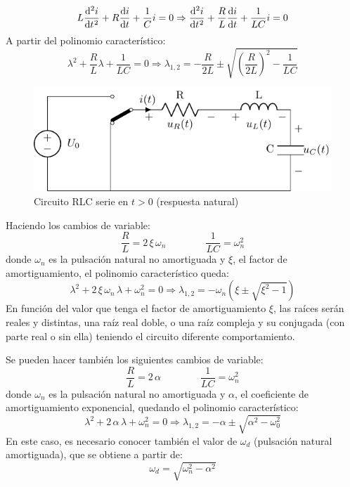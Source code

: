 \[
  L\diff[2]{i}{t} + R\diff{i}{t} + \frac{1}{C} i = 0 \Rightarrow
  {\diff[2]{i}{t} + \frac{R}{L} \diff{i}{t} + \frac{1}{LC} i = 0}
\]
A partir del polinomio característico:
\[
  \lambda^2 + \frac{R}{L} \lambda + \frac{1}{LC} = 0 \Rightarrow
  \lambda_{1,2} = -\frac{R}{2L} \pm \sqrt{\left(\frac{R}{2L}\right)^2
    - \frac{1}{LC}}
\]
\begin{figure}[H]
  \centering
  \includegraphics{../figs/transitorio_circuitoRLC_serie_t0+.pdf}
  \caption{Circuito RLC serie en $t>0$ (respuesta natural)}
  \label{fig.transitorio_serie_t0+}
\end{figure}

Haciendo los cambios de variable:
\begin{equation*} {\dfrac{R}{L}=2\,\xi\,\omega_n}\qquad \qquad
  {\dfrac{1}{LC}=\omega_n^2}
\end{equation*}
donde $\omega_n$ es la pulsación natural no amortiguada y $\xi$, el
factor de amortiguamiento, el polinomio característico queda:
\begin{equation*}
  \lambda^2+2\,\xi\,\omega_n\,\lambda + \omega_n^2=0 \Rightarrow \lambda_{1,2}=-\omega_n\left(\xi\pm\sqrt{\xi^2-1}\right)
\end{equation*}
En función del valor que tenga el factor de amortiguamiento $\xi$, las
raíces serán reales y distintas, una raíz real doble, o una raíz
compleja y su conjugada (con parte real o sin ella) teniendo el
circuito diferente comportamiento.
	
\begin{remark}
  Se pueden hacer también los siguientes cambios de variable:
  \begin{equation*} {\dfrac{R}{L}=2\,\alpha}\qquad \qquad
    {\dfrac{1}{LC}=\omega_n^2}
  \end{equation*}
  donde $\omega_n$ es la pulsación natural no amortiguada y $\alpha$,
  el coeficiente de amortiguamiento exponencial, quedando el polinomio
  característico:
  \begin{equation*}
    \lambda^2+2\,\alpha\,\lambda + \omega_n^2=0 \Rightarrow \lambda_{1,2}=-\alpha \pm \sqrt{\alpha^2 - \omega_0^2}
  \end{equation*}
  En este caso, es necesario conocer también el valor de $\omega_d$
  (pulsación natural amortiguada), que se obtiene a partir de:
  \begin{equation*}
    \omega_d=\sqrt{\omega_n^2-\alpha^2}
  \end{equation*}
\end{remark}
	
